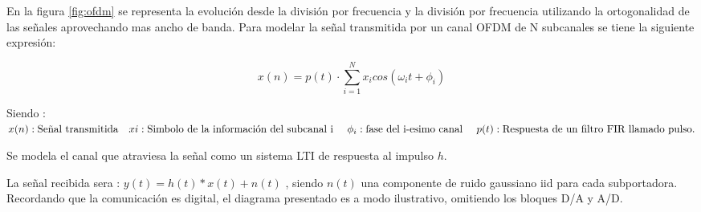 \documentclass[a4paper]{article}
\begin{document}
En la figura \ref{fig:ofdm} se representa la evolución desde la división por frecuencia y la división por frecuencia utilizando la ortogonalidad de las señales aprovechando mas ancho de banda. Para modelar la señal transmitida por un canal OFDM de N subcanales se tiene la siguiente expresión:

\begin{equation}
	x(n) = p(t) \cdot \sum_{i = 1}^{N} x_i cos(\omega_i t + \phi_i)
\end{equation}

Siendo : $	x(n) : \text{Señal transmitida} \quad 	xi : \text{Simbolo de la información del subcanal i } \\ \quad \phi_i : \text{fase del i-esimo canal }\quad p(t) : \text{Respuesta de un filtro FIR llamado pulso.} $


Se modela el canal que atraviesa la señal como un sistema LTI de respuesta al impulso $h$.
	
	
\begin{figure}[H]
	\centering
\end{figure}
	 
La señal recibida sera : $y(t) = h(t) \ast x(t) + n(t)$ , siendo $n(t)$ una componente de ruido gaussiano iid para cada subportadora. Recordando que la comunicación es digital, el diagrama presentado es a modo ilustrativo, omitiendo los bloques D/A y A/D. 
 
\end{document}

